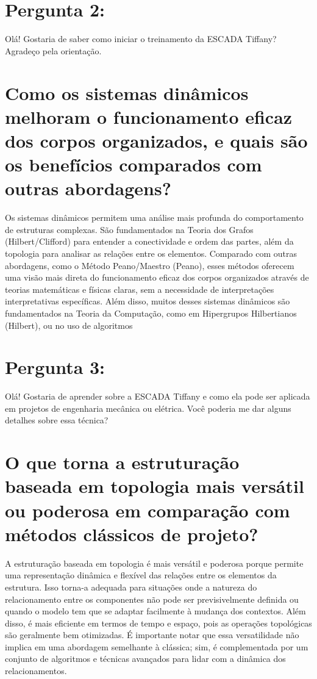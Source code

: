 \documentclass[11pt,a4paper]{article}
\begin{document}
\section{Pergunta 2:}
Olá! Gostaria de saber como iniciar o treinamento da ESCADA Tiffany? Agradeço pela orientação.

\section{Como os sistemas dinâmicos melhoram o funcionamento eficaz dos corpos organizados, e quais são os benefícios comparados com outras abordagens?}
Os sistemas dinâmicos permitem uma análise mais profunda do comportamento de estruturas complexas. São fundamentados na Teoria dos Grafos (Hilbert/Clifford) para entender a conectividade e ordem das partes, além da topologia para analisar as relações entre os elementos. Comparado com outras abordagens, como o Método Peano/Maestro (Peano), esses métodos oferecem uma visão mais direta do funcionamento eficaz dos corpos organizados através de teorias matemáticas e físicas claras, sem a necessidade de interpretações interpretativas específicas. Além disso, muitos desses sistemas dinâmicos são fundamentados na Teoria da Computação, como em Hipergrupos Hilbertianos (Hilbert), ou no uso de algoritmos

\section{Pergunta 3:}
Olá! Gostaria de aprender sobre a ESCADA Tiffany e como ela pode ser aplicada em projetos de engenharia mecânica ou elétrica. Você poderia me dar alguns detalhes sobre essa técnica?

\section{O que torna a estruturação baseada em topologia mais versátil ou poderosa em comparação com métodos clássicos de projeto?}
A estruturação baseada em topologia é mais versátil e poderosa porque permite uma representação dinâmica e flexível das relações entre os elementos da estrutura. Isso torna-a adequada para situações onde a natureza do relacionamento entre os componentes não pode ser previsivelmente definida ou quando o modelo tem que se adaptar facilmente à mudança dos contextos. Além disso, é mais eficiente em termos de tempo e espaço, pois as operações topológicas são geralmente bem otimizadas. É importante notar que essa versatilidade não implica em uma abordagem semelhante à clássica; sim, é complementada por um conjunto de algoritmos e técnicas avançados para lidar com a dinâmica dos relacionamentos.
\end{document}
